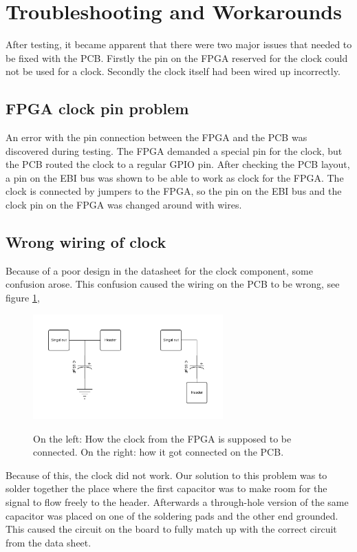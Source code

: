 \documentclass[../main/report.tex]{subfiles}
\begin{document}
\section{Troubleshooting and Workarounds}

After testing, it became apparent that there were two major issues that needed to be fixed with the PCB.
Firstly the pin on the FPGA reserved for the clock could not be used for a clock.
Secondly the clock itself had been wired up incorrectly.

\subsection*{FPGA clock pin problem}
An error with the pin connection between the FPGA and the PCB was discovered during testing.
The FPGA demanded a special pin for the clock, but the PCB routed the clock to a regular GPIO pin.
After checking the PCB layout, a pin on the EBI bus was shown to be able to work as clock for the FPGA.
The clock is connected by jumpers to the FPGA, so the pin on the EBI bus and the clock pin on the FPGA was changed around with wires.

\subsection*{Wrong wiring of clock}

Because of a poor design in the datasheet for the clock component, some confusion arose.
This confusion caused the wiring on the PCB to be wrong, see figure \ref{fig:pcb-clock},

\begin{figure}[H]
    \centering
    \includegraphics[width=0.65\textwidth]{../pcb/assets/pcb-clock.pdf}
    \label{fig:pcb-clock}
    \caption{On the left: How the clock from the FPGA is supposed to be connected.
             On the right: how it got connected on the PCB.}
\end{figure}

Because of this, the clock did not work.
Our solution to this problem was to solder together the place where the first capacitor was to make room for the signal to flow freely to the header.
Afterwards a through-hole version of the same capacitor was placed on one of the soldering pads and the other end grounded.
This caused the circuit on the board to fully match up with the correct circuit from the data sheet.
\end{document}
